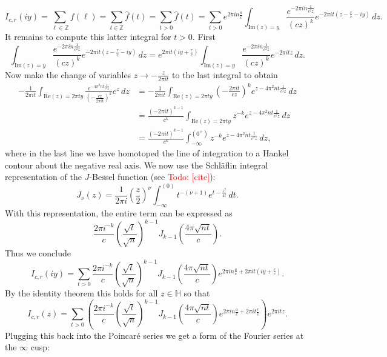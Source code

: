 \documentclass[12pt]{book}
\theoremstyle{definition}\newframedtheorem{method}{Method}
\newcommand{\Z}{\mathbb{Z}}
\renewcommand{\H}{\mathbb{H}}
\newcommand{\<}{\langle}
\renewcommand{\>}{\rangle}
\renewcommand{\Re}{\mathrm{Re}}
\renewcommand{\Im}{\mathrm{Im}}
\newcommand{\todo}[1]{\textcolor{red}{\sf Todo: [#1]}}
\begin{document}
      \[
        I_{c,r}(iy) = \sum_{\ell \in \Z}f(\ell) = \sum_{t \in \Z}\hat{f}(t) = \sum_{t > 0}\hat{f}(t) = \sum_{t > 0}e^{2\pi in\frac{a}{c}}\int_{\Im(z) = y}\frac{e^{-2\pi in\frac{1}{c^{2}z}}}{(cz)^{k}}e^{-2\pi it\left(z-\frac{r}{c}-iy\right)}\,dz.
      \]
      It remains to compute this latter integral for $t > 0$. First
      \[
        \int_{\Im(z) = y}\frac{e^{-2\pi in\frac{1}{c^{2}z}}}{(cz)^{k}}e^{-2\pi it\left(z-\frac{r}{c}-iy\right)}\,dz = e^{2\pi it\left(iy+\frac{r}{c}\right)}\int_{\Im(z) = y}\frac{e^{-2\pi in\frac{1}{c^{2}z}}}{(cz)^{k}}e^{-2\pi itz}\,dz.
      \]
      Now make the change of variables $z \to -\frac{z}{2\pi it}$ to the last integral to obtain
      \begin{align*}
        -\frac{1}{2\pi it}\int_{\Re(z) = 2\pi ty}\frac{e^{-4\pi^{2}nt\frac{1}{c^{2}z}}}{\left(-\frac{cz}{2\pi it}\right)^{k}}e^{z}\,dz &= -\frac{1}{2\pi it}\int_{\Re(z) = 2\pi ty}\left(-\frac{2\pi it}{cz}\right)^{k}e^{z-4\pi^{2}nt\frac{1}{c^{2}z}}\,dz \\
        &= \frac{(-2\pi it)^{k-1}}{c^{k}}\int_{\Re(z) = 2\pi ty}z^{-k}e^{z-4\pi^{2}nt\frac{1}{c^{2}z}}\,dz \\
        &= \frac{(-2\pi it)^{k-1}}{c^{k}}\int_{-\infty}^{(0^{+})}z^{-k}e^{z-4\pi^{2}nt\frac{1}{c^{2}z}}\,dz,
      \end{align*}
      where in the last line we have homotoped the line of integration to a Hankel contour about the negative real axis. We now use the Schl\"aflin integral representation of the $J$-Bessel function (see \todo{cite}):
      \[
        J_{\nu}(z) = \frac{1}{2\pi i}\left(\frac{z}{2}\right)^{\nu}\int_{-\infty}^{(0)}t^{-(\nu+1)}e^{t-\frac{z^{2}}{4t}}\,dt.
      \]
      With this representation, the entire term can be expressed as
      \[
        \frac{2\pi i^{-k}}{c}\left(\frac{\sqrt{t}}{\sqrt{n}}\right)^{k-1}J_{k-1}\left(\frac{4\pi\sqrt{nt}}{c}\right).
      \]
      Thus we conclude
      \[
        I_{c,r}(iy) = \sum_{t > 0}\frac{2\pi i^{-k}}{c}\left(\frac{\sqrt{t}}{\sqrt{n}}\right)^{k-1}J_{k-1}\left(\frac{4\pi\sqrt{nt}}{c}\right)e^{2\pi in\frac{a}{c}+2\pi it\left(iy+\frac{r}{c}\right)}.
      \]
      By the identity theorem this holds for all $z \in \H$ so that
      \[
        I_{c,r}(z) = \sum_{t > 0}\left(\frac{2\pi i^{-k}}{c}\left(\frac{\sqrt{t}}{\sqrt{n}}\right)^{k-1}J_{k-1}\left(\frac{4\pi\sqrt{nt}}{c}\right)e^{2\pi in\frac{a}{c}+2\pi it\frac{r}{c}}\right)e^{2\pi itz}.
      \]
      Plugging this back into the Poincar\'e series we get a form of the Fourier series at the $\infty$ cusp:
\end{document}
